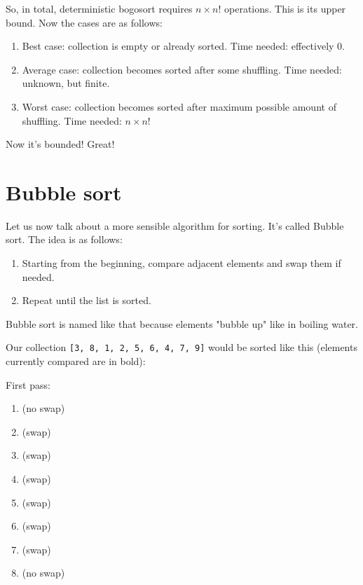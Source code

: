 \documentclass[a4paper, justified, notitlepage, sfsidenotes, notoc]{tufte-book}
\begin{document}
So, in total, deterministic bogosort requires \(n \times n!\) operations. This is its upper bound. Now the cases are as follows:

\begin{enumerate}
\item Best case: collection is empty or already sorted. Time needed: effectively \(0\).
\item Average case: collection becomes sorted after some shuffling. Time needed: unknown, but finite.
\item Worst case: collection becomes sorted after maximum possible amount of shuffling. Time needed: \(n \times n!\)
\end{enumerate}

Now it's bounded! Great!
\chapter{Bubble sort}
\label{sec:org15784ca}

Let us now talk about a more sensible algorithm for sorting. It's called Bubble sort. The idea is as follows:

\begin{enumerate}
\item Starting from the beginning, compare adjacent elements and swap them if needed.
\item Repeat until the list is sorted.
\end{enumerate}

Bubble sort is named like that because elements "bubble up" like in boiling water.

Our collection \texttt{[3, 8, 1, 2, 5, 6, 4, 7, 9]} would be sorted like this (elements currently compared are in bold):

First pass:

\begin{enumerate}
\item\relax [ \textbf{3, 8}, 1, 2, 5, 6, 4, 7, 9 ] (no swap)
\item\relax [ 3, \textbf{8, 1}, 2, 5, 6, 4, 7, 9 ] (swap)
\item\relax [ 3, 1, \textbf{8, 2}, 5, 6, 4, 7, 9 ] (swap)
\item\relax [ 3, 1, 2, \textbf{8, 5}, 6, 4, 7, 9 ] (swap)
\item\relax [ 3, 1, 2, 5, \textbf{8, 6}, 4, 7, 9 ] (swap)
\item\relax [ 3, 1, 2, 5, 6, \textbf{8, 4}, 7, 9 ] (swap)
\item\relax [ 3, 1, 2, 5, 6, 4, \textbf{8, 7}, 9 ] (swap)
\item\relax [ 3, 1, 2, 5, 6, 4, 7, \textbf{8, 9} ] (no swap)
\end{enumerate}
\end{document}
